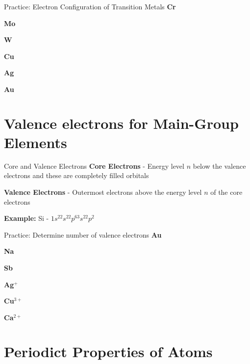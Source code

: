 \documentclass[11pt]{beamer}
\begin{document}
\begin{frame}{Practice: Electron Configuration of Transition Metals}
  \textbf{Cr}
  \vspace{0.25in}
  
  \textbf{Mo}
  \vspace{0.25in}
  
  \textbf{W}
  \vspace{0.25in}

  \textbf{Cu}
  \vspace{0.25in}

  \textbf{Ag}
  \vspace{0.25in}

  \textbf{Au}
  \vspace{0.25in}
\end{frame}

\section{Valence electrons for Main-Group Elements}

\begin{frame}{Core and Valence Electrons}
  \textbf{Core Electrons} - Energy level $n$ below the valence
  electrons and these are completely filled orbitals

  \textbf{Valence Electrons} - Outermost electrons above the energy
  level $n$ of the core electrons

  \textbf{Example:} Si - $1s^22s^22p^63s^22p^2$
\end{frame}

\begin{frame}{Practice: Determine number of valence electrons}
  \textbf{Au}
  \vspace{0.25in}

  \textbf{Na}
  \vspace{0.25in}
  
  \textbf{Sb}
  \vspace{0.25in}
  
  \textbf{Ag$^+$}
  \vspace{0.25in}

  \textbf{Cu$^{3+}$}
  \vspace{0.25in}

  \textbf{Ca$^{2+}$}
  \vspace{0.25in}
  
\end{frame}

\section{Periodict Properties of Atoms}
\end{document}
